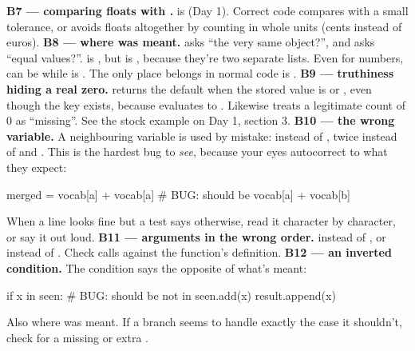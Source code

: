\documentclass[10pt,a4paper]{article}
\begin{document}
\textbf{B7 — comparing floats with \code{=\allowbreak{}=\allowbreak{}}.}  is  (Day 1). Correct code compares with a small tolerance, or avoids floats altogether by counting in whole units (cents instead of euros).
\textbf{B8 —  where \code{=\allowbreak{}=\allowbreak{}} was meant.}  asks “the very same object?”, and \code{=\allowbreak{}=\allowbreak{}} asks “equal values?”. \code{[1]\ =\allowbreak{}=\allowbreak{}\ [1]} is , but  is , because they’re two separate lists. Even for numbers,  can be  while  is . The only place  belongs in normal code is .
\textbf{B9 — truthiness hiding a real zero.}  returns the default when the stored value is  or \code{\textquotedbl{}\textquotedbl{}}, even though the key exists, because  evaluates to . Likewise  treats a legitimate count of 0 as “missing”. See the stock example on Day 1, section 3.
\textbf{B10 — the wrong variable.} A neighbouring variable is used by mistake:  instead of ,  twice instead of  and . This is the hardest bug to \emph{see}, because your eyes autocorrect to what they expect:
\begin{pycode}
merged = vocab[a] + vocab[a]       # BUG: should be vocab[a] + vocab[b]
\end{pycode}
When a line looks fine but a test says otherwise, read it character by character, or say it out loud.
\textbf{B11 — arguments in the wrong order.}  instead of , or  instead of . Check calls against the function’s definition.
\textbf{B12 — an inverted condition.} The condition says the opposite of what’s meant:
\begin{pycode}
if x in seen:                      # BUG: should be  not in
    seen.add(x)
    result.append(x)
\end{pycode}
Also  where  was meant. If a branch seems to handle exactly the case it shouldn’t, check for a missing or extra .
\end{document}
